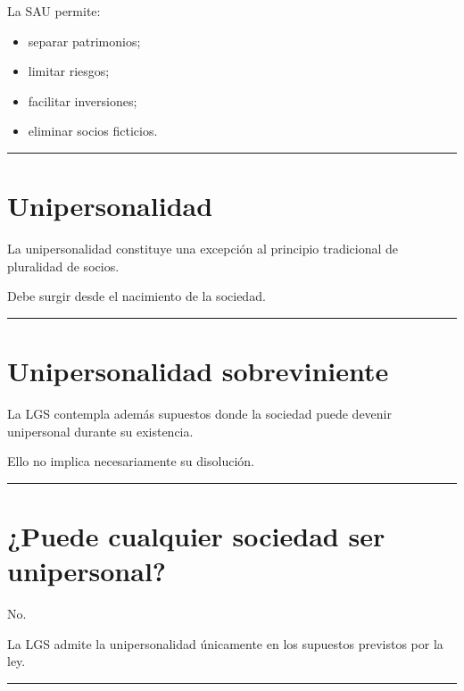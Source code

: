 \documentclass[
  spanish,
  letterpaper,
  DIV=11,
  numbers=noendperiod]{scrartcl}
\providecommand{\tightlist}{%
  \setlength{\itemsep}{0pt}\setlength{\parskip}{0pt}}
\begin{document}
La SAU permite:

\begin{itemize}
\tightlist
\item
  separar patrimonios;
\item
  limitar riesgos;
\item
  facilitar inversiones;
\item
  eliminar socios ficticios.
\end{itemize}

\begin{center}\rule{0.5\linewidth}{0.5pt}\end{center}

\section{Unipersonalidad}\label{unipersonalidad}

La unipersonalidad constituye una excepción al principio tradicional de
pluralidad de socios.

Debe surgir desde el nacimiento de la sociedad.

\begin{center}\rule{0.5\linewidth}{0.5pt}\end{center}

\section{Unipersonalidad
sobreviniente}\label{unipersonalidad-sobreviniente}

La LGS contempla además supuestos donde la sociedad puede devenir
unipersonal durante su existencia.

Ello no implica necesariamente su disolución.

\begin{center}\rule{0.5\linewidth}{0.5pt}\end{center}

\section{¿Puede cualquier sociedad ser
unipersonal?}\label{puede-cualquier-sociedad-ser-unipersonal}

No.

La LGS admite la unipersonalidad únicamente en los supuestos previstos
por la ley.

\begin{center}\rule{0.5\linewidth}{0.5pt}\end{center}
\end{document}
